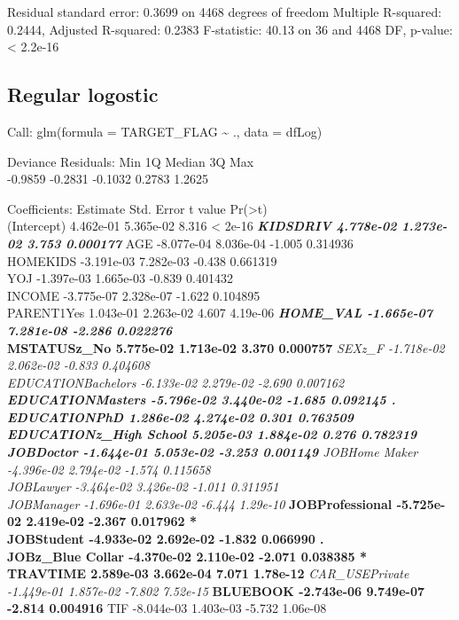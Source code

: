 \documentclass[]{article}
\begin{document}
Residual standard error: 0.3699 on 4468 degrees of freedom Multiple
R-squared: 0.2444, Adjusted R-squared: 0.2383 F-statistic: 40.13 on 36
and 4468 DF, p-value: \textless{} 2.2e-16

\hypertarget{regular-logostic}{%
\subsection{Regular logostic}\label{regular-logostic}}

Call: glm(formula = TARGET\_FLAG \textasciitilde{} ., data = dfLog)

Deviance Residuals: Min 1Q Median 3Q Max\\
-0.9859 -0.2831 -0.1032 0.2783 1.2625

Coefficients: Estimate Std. Error t value
Pr(\textgreater{}\textbar{}t\textbar{})\\
(Intercept) 4.462e-01 5.365e-02 8.316 \textless{} 2e-16 \textbf{\emph{
KIDSDRIV 4.778e-02 1.273e-02 3.753 0.000177 }} AGE -8.077e-04 8.036e-04
-1.005 0.314936\\
HOMEKIDS -3.191e-03 7.282e-03 -0.438 0.661319\\
YOJ -1.397e-03 1.665e-03 -0.839 0.401432\\
INCOME -3.775e-07 2.328e-07 -1.622 0.104895\\
PARENT1Yes 1.043e-01 2.263e-02 4.607 4.19e-06 \textbf{\emph{ HOME\_VAL
-1.665e-07 7.281e-08 -2.286 0.022276 }\\
MSTATUSz\_No 5.775e-02 1.713e-02 3.370 0.000757 }\emph{ SEXz\_F
-1.718e-02 2.062e-02 -0.833 0.404608\\
EDUCATIONBachelors -6.133e-02 2.279e-02 -2.690 0.007162 \textbf{
EDUCATIONMasters -5.796e-02 3.440e-02 -1.685 0.092145 .\\
EDUCATIONPhD 1.286e-02 4.274e-02 0.301 0.763509\\
EDUCATIONz\_High School 5.205e-03 1.884e-02 0.276 0.782319\\
JOBDoctor -1.644e-01 5.053e-02 -3.253 0.001149 } JOBHome Maker
-4.396e-02 2.794e-02 -1.574 0.115658\\
JOBLawyer -3.464e-02 3.426e-02 -1.011 0.311951\\
JOBManager -1.696e-01 2.633e-02 -6.444 1.29e-10 }\textbf{
JOBProfessional -5.725e-02 2.419e-02 -2.367 0.017962 *\\
JOBStudent -4.933e-02 2.692e-02 -1.832 0.066990 .\\
JOBz\_Blue Collar -4.370e-02 2.110e-02 -2.071 0.038385 *\\
TRAVTIME 2.589e-03 3.662e-04 7.071 1.78e-12 }\emph{ CAR\_USEPrivate
-1.449e-01 1.857e-02 -7.802 7.52e-15 }\textbf{ BLUEBOOK -2.743e-06
9.749e-07 -2.814 0.004916 } TIF -8.044e-03 1.403e-03 -5.732 1.06e-08
\end{document}
